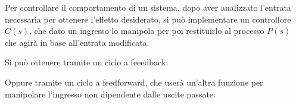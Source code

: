 \documentclass{article}
\numberwithin{equation}{subsection}
\begin{document}
Per controllare il comportamento di un sistema, dopo aver analizzato l'entrata necessaria per ottenere l'effetto desiderato, si può 
implementare un controllore $C(s)$, che dato un ingresso lo manipola per poi restituirlo al processo $P(s)$ che agirà in base all'entrata modificata. 


Si può ottenere tramite un ciclo a feeedback:

\begin{center}\end{center}

Oppure tramite un ciclo a feedforward, che userà un'altra funzione per manipolare l'ingresso non dipendente dalle uscite passate:
\end{document}
